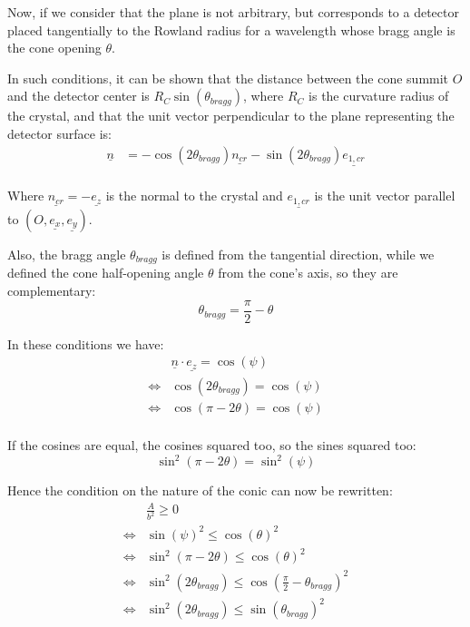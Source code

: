 \documentclass[a4paper,11pt,twoside,titlepage,openright]{book}
\numberwithin{equation}{section}
\begin{document}
Now, if we consider that the plane is not arbitrary, but corresponds to a
detector placed tangentially to the Rowland radius for a wavelength whose bragg
angle is the cone opening $\theta$.

In such conditions, it can be shown that the distance between the cone summit
$O$ and the detector center is $R_C\sin(\theta_{bragg})$, where $R_C$ is the curvature
radius of the crystal, and that the unit vector perpendicular to the plane
representing the detector surface is:
$$
\begin{array}{lll}
    \underline{n}
    & = -\cos(2\theta_{bragg})\underline{n_{cr}} - \sin(2\theta_{bragg})\underline{e_{1,cr}}\\
\end{array}
$$

Where $\underline{n_{cr}} = -\underline{e_{z}}$ is the normal to the crystal and
$\underline{e_{1,cr}}$ is the unit vector parallel to $(O, \underline{e_{x}},
\underline{e_{y}})$.

Also, the bragg angle $\theta_{bragg}$ is defined from the tangential
direction, while we defined the cone half-opening angle $\theta$ from the
cone's axis, so they are complementary:
$$
\theta_{bragg} = \frac{\pi}{2} - \theta
$$

In these conditions we have:
$$
\begin{array}{lll}
    & \underline{n}\cdot\underline{e_{z}} = \cos(\psi)\\
    \Leftrightarrow & \cos(2\theta_{bragg}) = \cos(\psi)\\
    \Leftrightarrow & \cos(\pi - 2\theta) = \cos(\psi)\\
\end{array}
$$

If the cosines are equal, the cosines squared too, so the sines squared too:
$$
\sin^2(\pi - 2\theta) = \sin^2(\psi)
$$

Hence the condition on the nature of the conic can now be rewritten:
$$
\begin{array}{lll}
    & \frac{A}{b^2} \geq 0\\
    \Leftrightarrow & \sin(\psi)^2 \leq \cos(\theta)^2\\
    \Leftrightarrow & \sin^2(\pi - 2\theta) \leq \cos(\theta)^2\\
    \Leftrightarrow & \sin^2(2\theta_{bragg}) \leq \cos(\frac{\pi}{2} -
    \theta_{bragg})^2\\
    \Leftrightarrow & \sin^2(2\theta_{bragg}) \leq \sin(\theta_{bragg})^2\\
\end{array}
$$
\end{document}
